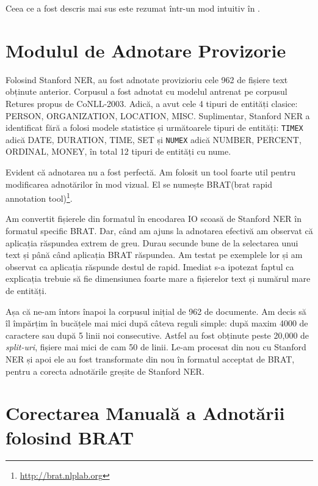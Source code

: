Ceea ce a fost descris mai sus este rezumat într-un mod intuitiv în . 



\section{Modulul de Adnotare Provizorie}

Folosind Stanford NER, au fost adnotate provizioriu cele 962 de fișiere text obținute anterior. Corpusul a fost adnotat cu modelul antrenat pe corpusul Retures propus de CoNLL-2003. Adică, a avut cele 4 tipuri de entități clasice: PERSON, ORGANIZATION, LOCATION, MISC. Suplimentar, Stanford NER a identificat fără a folosi modele statistice și următoarele tipuri de entități: \texttt{TIMEX} adică DATE, DURATION, TIME, SET și \texttt{NUMEX} adică NUMBER, PERCENT, ORDINAL, MONEY, în total 12 tipuri de entități cu nume.

Evident că adnotarea nu a fost perfectă. Am folosit un tool foarte util pentru modificarea adnotărilor în mod vizual. El se numește BRAT(brat rapid annotation tool)\footnote{\url{http://brat.nlplab.org}}.

Am convertit fișierele din formatul în encodarea IO scoasă de Stanford NER în formatul specific BRAT. Dar, când am ajuns la adnotarea efectivă am observat că aplicația răspundea extrem de greu. Durau secunde bune de la selectarea unui text și până când aplicația BRAT răspundea. Am testat pe exemplele lor și am observat ca aplicația răspunde destul de rapid. Imediat s-a ipotezat faptul ca explicația trebuie să fie dimensiunea foarte mare a fișierelor text și numărul mare de entități.

Așa că ne-am întors înapoi la corpusul inițial de 962 de documente. Am decis să îl împărțim în bucățele mai mici după câteva reguli simple: după maxim 4000 de caractere sau după 5 linii noi consecutive. Astfel au fost obținute peste 20,000 de \textit{split-uri}, fișiere mai mici de cam 50 de linii. Le-am procesat din nou cu Stanford NER și apoi ele au fost transformate din nou în formatul acceptat de BRAT, pentru a corecta adnotările greșite de Stanford NER.

\section{Corectarea Manuală a Adnotării folosind BRAT}
\label{section:brat-annotation}

